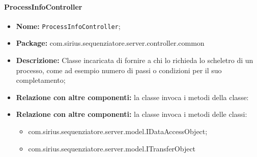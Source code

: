 \paragraph{ProcessInfoController}
	\begin{itemize}
		\item \textbf{Nome:} \texttt{ProcessInfoController};
		\item \textbf{Package:} com.sirius.sequenziatore.server.controller.common
		\item \textbf{Descrizione:} Classe incaricata di fornire a chi lo richieda lo scheletro di un processo, come ad esempio numero di passi o condizioni per il suo completamento;
		\item \textbf{Relazione con altre componenti:} la classe invoca i metodi della classe:
		\item \textbf{Relazione con altre componenti:} la classe invoca i metodi delle classi:
		\begin{itemize}
			\item com.sirius.sequenziatore.server.model.IDataAccessObject;
			\item com.sirius.sequenziatore.server.model.ITransferObject
		\end{itemize}
	\end{itemize}

